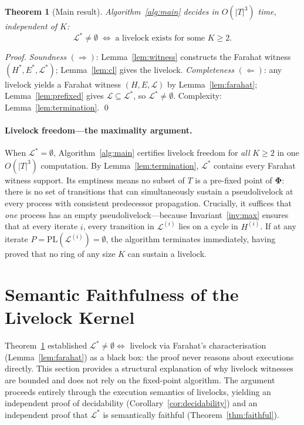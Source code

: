 \documentclass{article}
\newtheorem{theorem}{Theorem}
\newcommand{\Ls}{\mathcal{L}^{*}}
\newcommand{\Li}[1]{\mathcal{L}^{(#1)}}   %
\newcommand{\Hi}[1]{H^{(#1)}}             %
\newcommand{\PL}{\mathrm{PL}}
\newcommand{\bPhi}{\boldsymbol{\Phi}}
\newcommand{\Hstar}{H^{*}}
\newcommand{\Estar}{E^{*}}
\begin{document}
\begin{theorem}[Main result]
\label{thm:main}
Algorithm~\ref{alg:main} decides in $O(|T|^3)$ time, independent of $K$:
\[
  \Ls \neq \emptyset
  \;\iff\;
  \text{a livelock exists for some } K \geq 2.
\]
\end{theorem}

\begin{proof}
\emph{Soundness} $(\Rightarrow)$: Lemma~\ref{lem:witness} constructs the
Farahat witness $(\Hstar,\Estar,\Ls)$; Lemma~\ref{lem:cl} gives the
livelock.
\emph{Completeness} $(\Leftarrow)$: any livelock yields a Farahat witness
$(H,E,\mathcal{L})$ by Lemma~\ref{lem:farahat}; Lemma~\ref{lem:prefixed}
gives $\mathcal{L}\subseteq\Ls$, so $\Ls\neq\emptyset$.
Complexity: Lemma~\ref{lem:termination}. \qed
\end{proof}

\paragraph{Livelock freedom---the maximality argument.}
When $\Ls=\emptyset$, Algorithm~\ref{alg:main} certifies livelock
freedom for \emph{all} $K\!\geq\!2$ in one $O(|T|^3)$ computation.
By Lemma~\ref{lem:termination}, $\Ls$ contains every Farahat witness support.
Its emptiness means no subset of $T$ is a pre-fixed point of $\bPhi$:
there is no set of transitions that can simultaneously sustain a
pseudolivelock at every process with consistent predecessor propagation.
Crucially, it suffices that \emph{one} process has an empty
pseudolivelock---because Invariant~\ref{inv:max} ensures that at every
iterate $i$, every transition in $\Li{i}$ lies on a cycle in $\Hi{i}$.
If at any iterate $P=\PL(\Li{i})=\emptyset$, the algorithm terminates
immediately, having proved that no ring of any size $K$ can sustain a
livelock.

\section{Semantic Faithfulness of the Livelock Kernel}
\label{sec:semantics}
Theorem~\ref{thm:main} established $\Ls\neq\emptyset \iff$
livelock via Farahat's characterisation (Lemma~\ref{lem:farahat})
as a black box: the proof never reasons about executions directly.
This section provides a structural explanation of why livelock
witnesses are bounded and does not rely on the fixed-point algorithm.
The argument proceeds entirely through the execution semantics
of livelocks, yielding an independent proof of decidability
(Corollary~\ref{cor:decidability}) and an independent proof that
$\Ls$ is semantically faithful
(Theorem~\ref{thm:faithful}).
\end{document}
